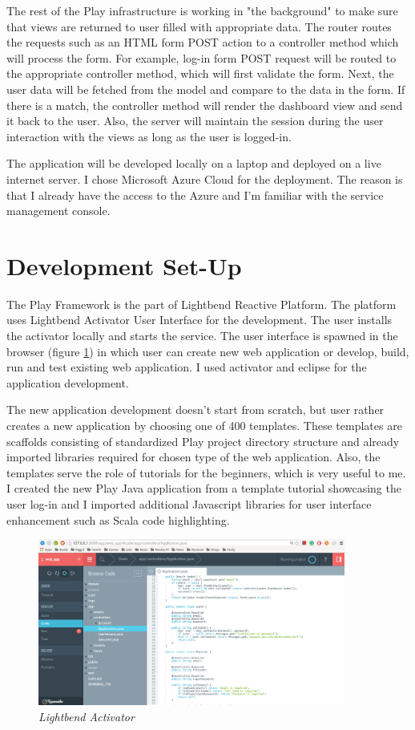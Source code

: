 \documentclass[12pt,twoside,a4paper]{report}
\begin{document}
The rest of the Play infrastructure is working in "the background" to make sure that views are returned to user filled with appropriate data. The router routes the requests such as an HTML form POST action to a controller method which will process the form. For example, log-in form POST request will be routed to the appropriate controller method, which will first validate the form. Next, the user data will be fetched from the model and compare to the data in the form. If there is a match, the controller method will render the dashboard view and send it back to the user. Also, the server will maintain the session during the user interaction with the views as long as the user is logged-in.

The application will be developed locally on a laptop and deployed on a live internet server. I chose Microsoft Azure Cloud for the deployment.  The reason is that I already have the access to the Azure and I'm familiar with the service management console.

\section{Development Set-Up}\label{4.2}
The Play Framework is the part of Lightbend Reactive Platform\cite{32}. The platform uses Lightbend Activator User Interface for the development. The user installs the activator locally and starts the service. The user interface is spawned in the browser (figure \ref{f4.2}) in which user can create new web application or develop, build, run and test existing web application. I used activator and eclipse for the application development.

The new application development doesn't start from scratch, but user rather creates a new application by choosing one of 400 templates. These templates are scaffolds consisting of standardized Play project directory structure and already imported libraries required for chosen type of the web application. Also, the templates serve the role of tutorials for the beginners, which is very useful to me. I created the new Play Java application from a template tutorial showcasing the user log-in and I imported additional Javascript libraries for user interface enhancement such as Scala code highlighting.

\begin{figure}[!ht]
	\centering
		\includegraphics[width=0.9\textwidth, totalheight=8cm]
		{activator}
	\caption{\textit{Lightbend Activator}}
	\label{f4.2}
\end{figure}
\end{document}
